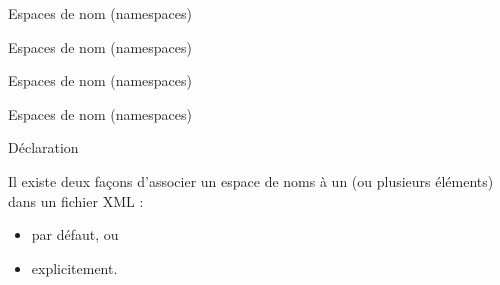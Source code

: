 

 
\begin{frame}{Espaces de nom (namespaces)}

\begin{center}
\end{center}

\end{frame}


\begin{frame}{Espaces de nom (namespaces)}

\begin{center}
\end{center}

\end{frame}


\begin{frame}{Espaces de nom (namespaces)}

\begin{center}
\end{center}

\end{frame}


\begin{frame}{Espaces de nom (namespaces)}

\begin{center}
\end{center}


\end{frame}



\begin{frame}{Déclaration}

Il existe deux façons d'associer un espace de noms à un (ou plusieurs éléments) dans un fichier XML :
\begin{itemize}
\item par défaut, ou
\item explicitement.
\end{itemize}

\end{frame}

